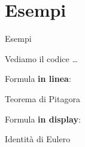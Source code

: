 \section{Esempi}
  \begin{frame}{Esempi}

    Vediamo il codice \dots

    Formula \textbf{in linea}:

    \begin{exampleblock}{Teorema di Pitagora}
      
    \end{exampleblock}

    Formula \textbf{in display}:

    \begin{exampleblock}{Identità di Eulero}
      
    \end{exampleblock}

\end{frame}
